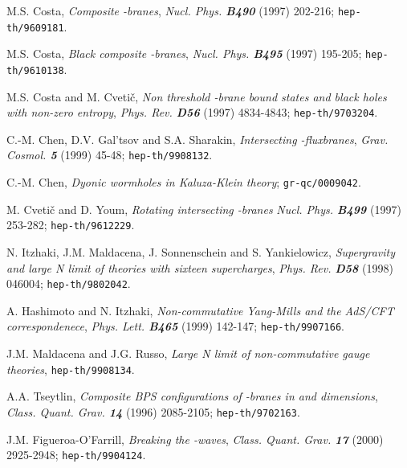 \documentclass[a4paper,12pt]{article}
\begin{document}
\begin{thebibliography}{99}
    M.S. Costa,
    {\sl Composite \coordHE{}-branes},
    {\it Nucl. Phys. \bf B490} (1997) 202-216;
    {\tt hep-th/9609181}.

    M.S. Costa,
    {\sl Black composite \coordHE{}-branes},
    {\it Nucl. Phys. \bf B495} (1997) 195-205;
    {\tt hep-th/9610138}.

    M.S. Costa and M. Cveti\v{c},
    {\sl Non threshold \coordHE{}-brane bound states and black holes with
         non-zero entropy},
    {\it Phys. Rev. \bf D56} (1997) 4834-4843;
    {\tt hep-th/9703204}.

    C.-M. Chen, D.V. Gal'tsov and S.A. Sharakin,
    {\sl Intersecting \coordHE{}-fluxbranes},
    {\it Grav. Cosmol. \bf 5} (1999) 45-48;
    {\tt hep-th/9908132}.

    C.-M. Chen,
    {\sl Dyonic wormholes in \coordHE{} Kaluza-Klein theory};
    {\tt gr-qc/0009042}.

    M. Cveti\v{c} and D. Youm,
    {\sl Rotating intersecting \coordHE{}-branes}
    {\it Nucl. Phys. \bf B499} (1997) 253-282;
    {\tt hep-th/9612229}.

    N. Itzhaki, J.M. Maldacena, J. Sonnenschein and S. Yankielowicz,
    {\sl Supergravity and large N limit of theories with sixteen
         supercharges},
    {\it Phys. Rev. \bf D58} (1998) 046004;
    {\tt hep-th/9802042}.

    A. Hashimoto and N. Itzhaki,
    {\sl Non-commutative Yang-Mills and the AdS/CFT correspondenece},
    {\it Phys. Lett. \bf B465} (1999) 142-147;
    {\tt hep-th/9907166}.

    J.M. Maldacena and J.G. Russo,
    {\it Large N limit of non-commutative gauge theories},
    {\tt hep-th/9908134}.

    A.A. Tseytlin,
    {\sl Composite BPS configurations of \coordHE{}-branes in \coordHE{} and
         \coordHE{} dimensions},
    {\it Class. Quant. Grav. \bf 14} (1996) 2085-2105;
    {\tt hep-th/9702163}.

    J.M. Figueroa-O'Farrill,
    {\sl Breaking the \coordHE{}-waves},
    {\it Class. Quant. Grav. \bf 17} (2000) 2925-2948;
    {\tt hep-th/9904124}.



\end{thebibliography}
\end{document}
